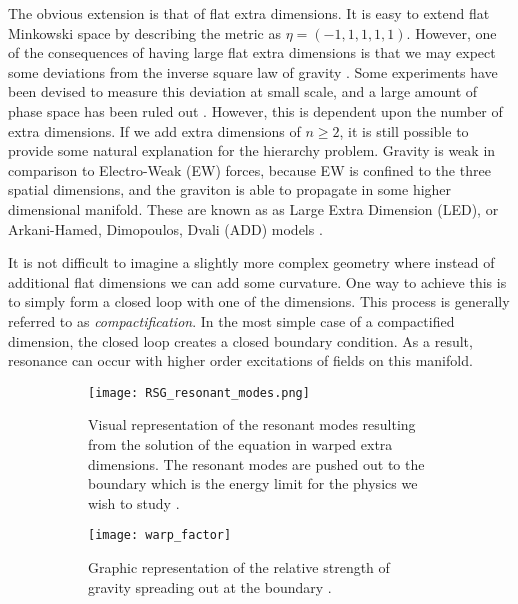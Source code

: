 \documentclass[12pt]{article}
\begin{document}
The obvious extension is that of flat extra dimensions. It is easy to extend
flat Minkowski space by describing the metric as $\eta = (-1,1,1,1,1)$. However,
one of the consequences of having large flat extra dimensions is that we may
expect some deviations from the inverse square law of gravity \cite{bsm}. Some
experiments have been devised to measure this deviation at small scale, and a
large amount of phase space has been ruled out \cite{bsm}. However, this is
dependent upon the number of extra dimensions. If we add extra dimensions of
$n\geq 2$, it is still possible to provide some natural explanation for the
hierarchy problem. Gravity is weak in comparison to Electro-Weak (EW) forces,
because EW is confined to the three spatial dimensions, and the graviton is able
to propagate in some higher dimensional manifold. These are known as as Large
Extra Dimension (LED), or Arkani-Hamed, Dimopoulos, Dvali (ADD) models
\cite{Arkani_Hamed_1998, Arkani_Hamed_1999}. 

It is not difficult to imagine a slightly more complex geometry where instead of
additional flat dimensions we can add some curvature. One way to achieve this is
to simply form a closed loop with one of the dimensions. This process is
generally referred to as \textit{compactification}. In the most simple case of a
compactified dimension, the closed loop creates a closed boundary condition. As
a result, resonance can occur with higher order excitations of fields on this
manifold. 

\begin{figure}[t]
    \centering
    \begin{subfigure}[t]{.48\textwidth}
        \centering
        \texttt{[image: RSG\_resonant\_modes.png]}
        \caption{Visual representation of the resonant modes resulting from the
        solution of the equation in warped extra dimensions. The resonant modes
        are pushed out to the boundary which is the energy limit for the physics we
        wish to study \cite{bsm}.}
        \label{subfig:RSG_resonant_modes}
    \end{subfigure}
    \hfill
    \begin{subfigure}[t]{.48\textwidth}
        \centering
        \texttt{[image: warp\_factor]}
        \caption{Graphic representation of the relative strength of gravity
        spreading out at the boundary \cite{bsm}.}
        \label{subfig:warp_factor}
    \end{subfigure}
\caption{}
\label{fig:theoretical_motivation_figure}
\end{figure}
\end{document}
